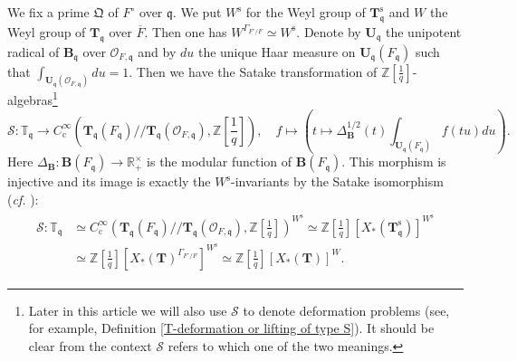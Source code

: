 \documentclass[12pt,oneside,reqno]{amsart}
\theoremstyle{plain}
\begin{document}
	We fix a prime $\mathfrak{Q}$ of $F^\circ$
	over $\mathfrak{q}$.
	We put
	$W^\mathrm{s}$
	for the Weyl group of
	$\mathbf{T}_\mathfrak{q}^\mathrm{s}$
	and
	$W$
	the Weyl group of $\mathbf{T}_\mathfrak{q}$ over
	$\overline{F}$.
	Then one has
	$W^{\Gamma_{F^\circ/F}}\simeq
	W^\mathrm{s}$.
	Denote by
	$\mathbf{U}_\mathfrak{q}$
	the unipotent radical of $\mathbf{B}_\mathfrak{q}$ over
	$\mathcal{O}_{F,\mathfrak{q}}$
	and
	by
	$du$
	the unique Haar measure on
	$\mathbf{U}_\mathfrak{q}
	(F_\mathfrak{q})$
	such that
	$\int_{\mathbf{U}_\mathfrak{q}(\mathcal{O}_{F,\mathfrak{q}})}du=1$.
	Then we have the Satake transformation
	of
	$\mathbb{Z}[\frac{1}{q}]$-algebras\footnote{Later in this article we will also use $\mathcal{S}$ to denote deformation problems (see, for example, Definition \ref{T-deformation or lifting of type S}). It should be clear from the context $\mathcal{S}$ refers to which one of the two meanings.}
	\[
	\mathcal{S}
	\colon
	\mathbb{T}_\mathfrak{q}
	\rightarrow
	C_\mathrm{c}^\infty
	(
	\mathbf{T}_\mathfrak{q}(F_\mathfrak{q})//
	\mathbf{T}_\mathfrak{q}(\mathcal{O}_{F,\mathfrak{q}}),
	\mathbb{Z}[\frac{1}{q}]
	),
	\quad
	f\mapsto
	\left(
	t\mapsto
	\Delta_{\mathbf{B}}^{1/2}(t)
	\int_{\mathbf{U}_\mathfrak{q}(F_\mathfrak{q})}
	f(tu)du
	\right). 
	\]
	Here
	$\Delta_{\mathbf{B}}
	\colon
	\mathbf{B}(F_\mathfrak{q})
	\rightarrow
	\mathbb{R}_+^\times$
	is the modular function of
	$\mathbf{B}(F_\mathfrak{q})$.
	This morphism is injective and its image is exactly
	the $W^\mathrm{s}$-invariants
	by the Satake isomorphism
	(\emph{cf.}
	\cite{Gross1998}):
	\begin{align}\label{Satake isomorphism}
		\begin{split}
			\mathcal{S}
			\colon
			\mathbb{T}_\mathfrak{q}
			&
			\simeq
			C_\mathrm{c}^\infty
			(
			\mathbf{T}_\mathfrak{q}(F_\mathfrak{q})//
			\mathbf{T}_\mathfrak{q}(\mathcal{O}_{F,\mathfrak{q}}),
			\mathbb{Z}[\frac{1}{q}]
			)^{W^\mathrm{s}}
			\simeq
			\mathbb{Z}[\frac{1}{q}][X_\ast(\mathbf{T}_\mathfrak{q}^\mathrm{s})]^{W^\mathrm{s}}
			\\
			&
			\simeq
			\mathbb{Z}[\frac{1}{q}][X_\ast(\mathbf{T})^{\Gamma_{F^\circ/F}}]^{W^\mathrm{s}}
			\simeq
			\mathbb{Z}[\frac{1}{q}]
			[X_\ast(\mathbf{T})]^W.
		\end{split}
	\end{align}
	
	
	
\end{document}
